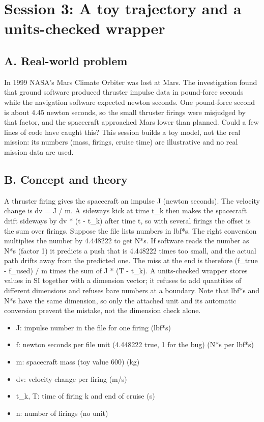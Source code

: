 \documentclass[11pt,a4paper]{article}
\begin{document}
\section{Session 3: A toy trajectory and a units-checked wrapper}

\subsection*{A. Real-world problem}
In 1999 NASA's Mars Climate Orbiter was lost at Mars. The investigation found that ground software produced thruster impulse data in pound-force seconds while the navigation software expected newton seconds. One pound-force second is about 4.45 newton seconds, so the small thruster firings were misjudged by that factor, and the spacecraft approached Mars lower than planned. Could a few lines of code have caught this? This session builds a toy model, not the real mission: its numbers (mass, firings, cruise time) are illustrative and no real mission data are used.

\subsection*{B. Concept and theory}
A thruster firing gives the spacecraft an impulse J (newton seconds). The velocity change is dv = J / m. A sideways kick at time t\_k then makes the spacecraft drift sideways by dv * (t - t\_k) after time t, so with several firings the offset is the sum over firings. Suppose the file lists numbers in lbf*s. The right conversion multiplies the number by 4.448222 to get N*s. If software reads the number as N*s (factor 1) it predicts a push that is 4.448222 times too small, and the actual path drifts away from the predicted one. The miss at the end is therefore (f\_true - f\_used) / m times the sum of J * (T - t\_k). A units-checked wrapper stores values in SI together with a dimension vector; it refuses to add quantities of different dimensions and refuses bare numbers at a boundary. Note that lbf*s and N*s have the same dimension, so only the attached unit and its automatic conversion prevent the mistake, not the dimension check alone.

\begin{itemize}[nosep]
\item J: impulse number in the file for one firing (lbf*s)
\item f: newton seconds per file unit (4.448222 true, 1 for the bug) (N*s per lbf*s)
\item m: spacecraft mass (toy value 600) (kg)
\item dv: velocity change per firing (m/s)
\item t\_k, T: time of firing k and end of cruise (s)
\item n: number of firings (no unit)
\end{itemize}
\end{document}
